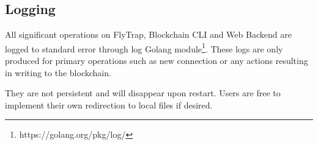 \subsection{Logging}
All significant operations on FlyTrap, Blockchain CLI and Web Backend are logged to standard error through log Golang module\footnote{https://golang.org/pkg/log/}. These logs are only produced for primary operations such as new connection or any actions resulting in writing to the blockchain.

They are not persistent and will disappear upon restart. Users are free to implement their own redirection to local files if desired.

